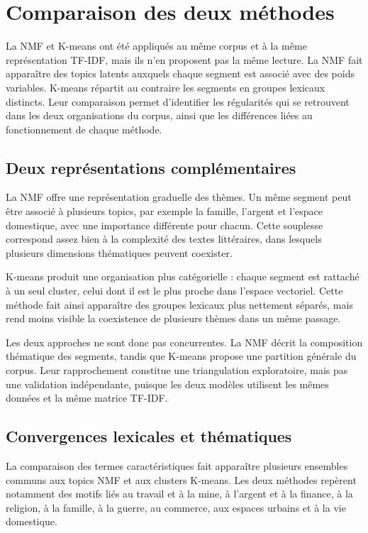 
\section{Comparaison des deux méthodes}

La NMF et K-means ont été appliqués au même corpus et à la même représentation TF-IDF, mais ils n'en proposent pas la même lecture. La NMF fait apparaître des topics latents auxquels chaque segment est associé avec des poids variables. K-means répartit au contraire les segments en groupes lexicaux distincts. Leur comparaison permet d'identifier les régularités qui se retrouvent dans les deux organisations du corpus, ainsi que les différences liées au fonctionnement de chaque méthode.

\subsection{Deux représentations complémentaires}

La NMF offre une représentation graduelle des thèmes. Un même segment peut être associé à plusieurs topics, par exemple la famille, l'argent et l'espace domestique, avec une importance différente pour chacun. Cette souplesse correspond assez bien à la complexité des textes littéraires, dans lesquels plusieurs dimensions thématiques peuvent coexister.

K-means produit une organisation plus catégorielle : chaque segment est rattaché à un seul cluster, celui dont il est le plus proche dans l'espace vectoriel. Cette méthode fait ainsi apparaître des groupes lexicaux plus nettement séparés, mais rend moins visible la coexistence de plusieurs thèmes dans un même passage.

Les deux approches ne sont donc pas concurrentes. La NMF décrit la composition thématique des segments, tandis que K-means propose une partition générale du corpus. Leur rapprochement constitue une triangulation exploratoire, mais pas une validation indépendante, puisque les deux modèles utilisent les mêmes données et la même matrice TF-IDF.

\subsection{Convergences lexicales et thématiques}

La comparaison des termes caractéristiques fait apparaître plusieurs ensembles communs aux topics NMF et aux clusters K-means. Les deux méthodes repèrent notamment des motifs liés au travail et à la mine, à l'argent et à la finance, à la religion, à la famille, à la guerre, au commerce, aux espaces urbains et à la vie domestique.

